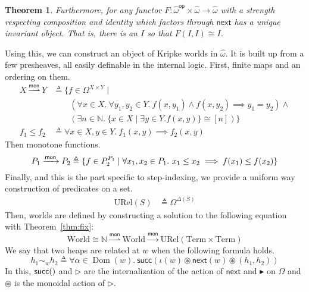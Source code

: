 \documentclass[a0,landscape]{a0poster}
\newtheorem{thm}{Theorem}
\newcommand{\op}[1]{\ensuremath{#1^{\mathsf{op}}}}
\newcommand{\presheaves}[1]{\ensuremath{\widehat{#1}}}
\newcommand{\mto}{\ensuremath{\xrightarrow{\mathsf{mon}}}}
\newcommand{\ptofin}{\ensuremath{\overset{\mathsf{mon}}{\rightharpoonup}}}
\newcommand{\nat}{\ensuremath{\mathbb{N}}}
\newcommand{\defs}{\ensuremath{\mathrel{\triangleq}}}
\newcommand{\sincl}[1]{\ensuremath{\mathsf{succ}(#1)}}
\DeclareMathOperator{\dom}{Dom}
\newcommand{\worlds}{\ensuremath{\mathrm{World}}}
\newcommand{\term}{\ensuremath{\mathrm{Term}}}
\newcommand{\urel}{\ensuremath{\mathrm{URel}}}
\newcommand{\later}{\ensuremath{{\blacktriangleright}}}
\newcommand{\ilater}{\ensuremath{{\triangleright}}}
\newcommand{\delay}{\mathsf{next}}
\newcommand{\zap}{\ensuremath{\circledast}}
\begin{document}
\begin{multicols}{4}
\begin{thm}
    Furthermore, for any functor
    $F : \op{\presheaves{\omega}} \times \presheaves{\omega} \to \presheaves{\omega}$
    with a strength respecting composition and identity which factors
    through $\delay$ has a unique invariant object. That is, there is
    an $I$ so that $F(I, I) \cong I$.
  \end{thm}
  Using this, we can construct an object of Kripke worlds in
  $\presheaves{\omega}$. It is built up from a few presheaves,
  all easily definable in the internal logic. First, finite maps and
  an ordering on them.
  \begin{align*}
    X \ptofin Y &\defs \{f \in \Omega^{X \times Y} \mid\\
    &\qquad (\forall x \in X.\ \forall y_1, y_2 \in Y.\ f(x, y_1) \land f(x, y_2) \implies y_1 = y_2) \land {}\\
    &\qquad (\exists n \in \nat.\ \{x \in X \mid \exists y \in Y. f(x, y)\} \cong [n])\}\\
    f_1 \le f_2 &\defs \forall x \in X, y \in Y.\ f_1(x, y) \implies f_2(x, y)
  \end{align*}
  Then monotone functions.
  \[
    P_1 \mto P_2 \defs \{f \in P_2^{P_1} \mid
    \forall x_1, x_2 \in P_1.\ x_1 \le x_2 \implies f(x_1) \le f(x_2)\}\\
  \]
  Finally, and this is the part specific to step-indexing, we provide
  a uniform way construction of predicates on a set.
  \begin{align*}
    \urel(S) &\defs \Omega^{\Delta(S)}
  \end{align*}
  Then, worlds are defined by constructing a solution to the following
  equation with Theorem~\ref{thm:fix}:
  \[
    \worlds \cong \nat \ptofin \worlds \mto \urel(\term \times \term)
  \]
  We say that two heaps are related at $w$ when the following formula
  holds.
  \[
    h_1 \sim_w h_2 \defs \forall \alpha \in \dom(w).
    \ \sincl{\iota(w) \zap \delay(w) \zap (h_1, h_2)}
  \]
  In this, $\sincl$ and $\ilater$ are the internalization of the
  action of $\delay$ and $\later$ on $\Omega$ and $\zap$ is the
  monoidal action of $\ilater$.

  \vfill\null


\end{multicols}
\end{document}
